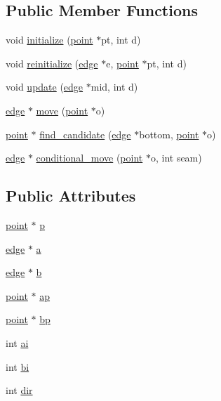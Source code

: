 \subsection*{Public Member Functions}
\begin{DoxyCompactItemize}
\item 
void \hyperlink{structpv__side_a163c81bef5a8989bb0f307e7ce72f555}{initialize} (\hyperlink{classpoint}{point} $\ast$pt, int d)
\item 
void \hyperlink{structpv__side_a5db6958f81fc211625a2337acc8fb72e}{reinitialize} (\hyperlink{classedge}{edge} $\ast$e, \hyperlink{classpoint}{point} $\ast$pt, int d)
\item 
void \hyperlink{structpv__side_aeefb5cadc78fb95fa4e145a757a68b72}{update} (\hyperlink{classedge}{edge} $\ast$mid, int d)
\item 
\hyperlink{classedge}{edge} $\ast$ \hyperlink{structpv__side_a58d4b8e4888146331f3af5a3a6a0eaa6}{move} (\hyperlink{classpoint}{point} $\ast$o)
\item 
\hyperlink{classpoint}{point} $\ast$ \hyperlink{structpv__side_ab6c6440d122035bd15a096d96350ce77}{find\-\_\-candidate} (\hyperlink{classedge}{edge} $\ast$bottom, \hyperlink{classpoint}{point} $\ast$o)
\item 
\hyperlink{classedge}{edge} $\ast$ \hyperlink{structpv__side_ab982252ee33bd8b4d6609f35506fe898}{conditional\-\_\-move} (\hyperlink{classpoint}{point} $\ast$o, int seam)
\end{DoxyCompactItemize}
\subsection*{Public Attributes}
\begin{DoxyCompactItemize}
\item 
\hyperlink{classpoint}{point} $\ast$ \hyperlink{structpv__side_a3928abff0a5599798efc9fe8c33e0cfb}{p}
\item 
\hyperlink{classedge}{edge} $\ast$ \hyperlink{structpv__side_ac696ba7ef00b7bd57fd286b002473805}{a}
\item 
\hyperlink{classedge}{edge} $\ast$ \hyperlink{structpv__side_a61ccae24216776d1395abb33999a921c}{b}
\item 
\hyperlink{classpoint}{point} $\ast$ \hyperlink{structpv__side_af15ca1b413508ff5bcdd7febe266cb00}{ap}
\item 
\hyperlink{classpoint}{point} $\ast$ \hyperlink{structpv__side_a5582f9b842acaa2aa4a54be2beff5af5}{bp}
\item 
int \hyperlink{structpv__side_ac5321a47babd8c9d8d15c486d0b94f3e}{ai}
\item 
int \hyperlink{structpv__side_ae76d8647bc2e09adea965cf804e48165}{bi}
\item 
int \hyperlink{structpv__side_ab521366c9cb3938efd02212c05bfbe76}{dir}
\end{DoxyCompactItemize}


